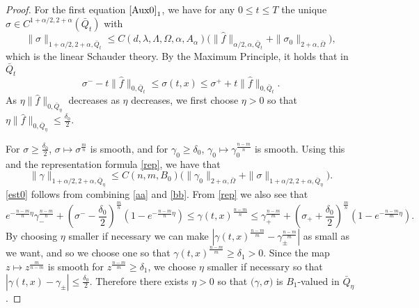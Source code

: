\documentclass[a4paper,11pt]{article}
\theoremstyle{remark}
\begin{document}
\begin{proof}
For the first equation $\eqref{Aux0}_1$, we have for any $0 \le t\le T$  the unique $\sigma \in C^{1+\alpha/2,2+\alpha}(\bar{Q}_t)$ with
 \begin{equation} \label{aa}
 \|\sigma\|_{1+\alpha/2, 2+\alpha, \bar{Q}_{t}} \le C(d,\lambda,\Lambda,\Omega,\alpha, A_\alpha) \big(\|\hat{f}\|_{\alpha/2,\alpha,\bar{Q}_t} + \|\sigma_0\|_{2+\alpha,\bar{\Omega}}\big), 
 \end{equation}
 which is the linear Schauder theory.
 By the Maximum Principle, it holds that in $\bar{Q}_t$ 
  $$\sigma^- -t\|\hat{f}\|_{0,\bar{Q}_t} \le \sigma(t,x) \le \sigma^+ +t\|\hat{f}\|_{0,\bar{Q}_t}.$$
  As $\eta\|\hat{f}\|_{0,\bar{Q}_\eta}$ decreases as $\eta$ decreases, we first choose $\eta>0$ so that $\eta\|\hat{f}\|_{0,\bar{Q}_\eta} \le \frac{\delta_0}{2}$.
 
 For $\sigma\ge \frac{\delta_0}{2}$, $\sigma \mapsto \sigma^{\frac{m}{n}}$ is smooth, and for $\gamma_0 \ge \delta_0$, $\gamma_0 \mapsto \gamma_0^{\frac{n-m}{n}}$ is smooth. Using this and the representation formula \eqref{rep}, we have that
  \begin{equation} \label{bb}
 \|\gamma\|_{1+\alpha/2, 2+\alpha, \bar{Q}_{\eta}} \le C(n,m,B_0) \big(\|\gamma_0\|_{2+\alpha,\bar{\Omega}} + \|\sigma\|_{1+\alpha/2, 2+\alpha, \bar{Q}_{\eta}}\big).   
  \end{equation}
 \eqref{est0} follows from combining \eqref{aa} and \eqref{bb}. From \eqref{rep} we also see that
   $$ e^{-\frac{n-m}{n}\eta} \gamma_-^{\frac{n-m}{n}} + \left(\sigma^- -\frac{\delta_0}{2}\right)^{\frac{m}{n}}\left(1- e^{-\frac{n-m}{n}\eta}\right) \le \gamma(t,x)^{\frac{n-m}{n}} \le \gamma_+^{\frac{n-m}{m}} + \left(\sigma_+ +  \frac{\delta_0}{2}\right)^\frac{m}{n}\left(1- e^{-\frac{n-m}{m}\eta}\right).$$
 By choosing $\eta$ smaller if necessary we can make
 $\left|\gamma(t,x)^{\frac{n-m}{m}} - \gamma_\pm^{\frac{n-m}{m}}\right|$ as small as we want, and so we choose one so that $\gamma(t,x)^{\frac{n-m}{m}}\ge \delta_1>0$. Since the map $z \mapsto z^\frac{m}{n-m}$ is smooth for $z^{\frac{n-m}{m}}\ge \delta_1$, we choose $\eta$ smaller if necessary so that $\left|\gamma(t,x) - \gamma_\pm\right|\le \frac{\delta_0}{2}.$ Therefore there exists $\eta>0$ so that $\big(\gamma,\sigma\big)$ is $B_1$-valued in $\bar{Q}_\eta$. 
 \end{proof}
\end{document}
